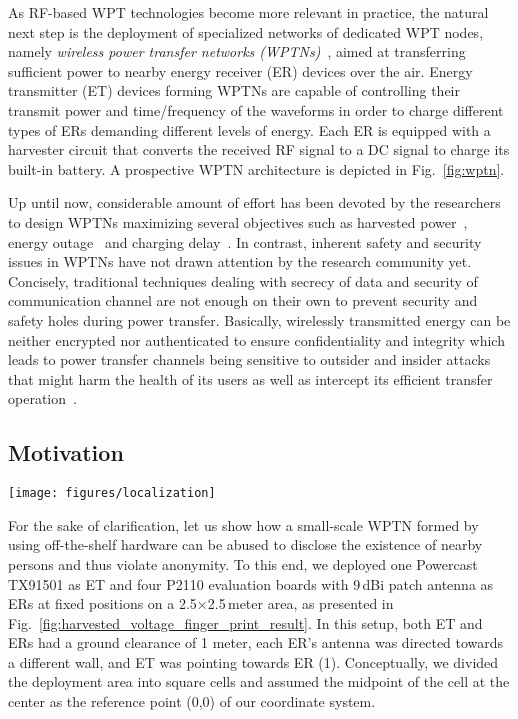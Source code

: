 \documentclass[journal,10pt,draftclsnofoot,onecolumn]{IEEEtran}
\begin{document}
As RF-based WPT technologies become more relevant in practice, the natural next step is the deployment of specialized networks of dedicated WPT nodes, namely \emph{wireless power transfer networks (WPTNs)}~\cite{liu15gwptn}, aimed at transferring sufficient power to nearby energy receiver (ER) devices over the air. Energy transmitter (ET) devices forming WPTNs are capable of controlling their transmit power and time/frequency of the waveforms in order to charge different types of ERs demanding different levels of energy. Each ER is equipped with a harvester circuit that converts the received RF signal to a DC signal to charge its built-in battery. A prospective WPTN architecture is depicted in Fig.~\ref{fig:wptn}.

Up until now, considerable amount of effort has been devoted by the researchers to design WPTNs maximizing several objectives such as harvested power~\cite{krikidis_tcom_2013}, energy outage~\cite{huang_arxiv_2012} and charging delay~\cite{fu_infocom_2013}. In contrast, inherent safety and security issues in WPTNs have not drawn attention by the research community yet. Concisely, traditional techniques dealing with secrecy of data and security of communication channel are not enough on their own to prevent security and safety holes during power transfer. Basically, wirelessly transmitted energy can be neither encrypted nor authenticated to ensure confidentiality and integrity which leads to power transfer channels being sensitive to outsider and insider attacks that might harm the health of its users as well as intercept its efficient transfer operation~\cite{secure_cooperative_kang_2015}. 

\subsection{Motivation}

\begin{figure*}
	\centering
	\texttt{[image: figures/localization]}
	\caption{The measured voltage level at the receiver (ER) when a person is present at different locations of an university office. Each square in each of four heatmaps represents a measured voltage by the harvester (located at the center of a room) with a person located at the marked position. Center square (marked by a black line) represents a measurement with no person present.}
	\label{fig:harvested_voltage_finger_print_result}
\end{figure*}

For the sake of clarification, let us show how a small-scale WPTN formed by using off-the-shelf hardware can be abused to disclose the existence of nearby persons and thus violate anonymity. To this end, we deployed one Powercast TX91501 as ET and four P2110 evaluation boards with 9\,dBi patch antenna as ERs at fixed positions on a 2.5$\times$2.5\,meter area, as presented in Fig.~\ref{fig:harvested_voltage_finger_print_result}. In this setup, both ET and ERs had a ground clearance of 1 meter, each ER's antenna was directed towards a different wall, and ET was pointing towards ER (1). Conceptually, we divided the deployment area into square cells and assumed the midpoint of the cell at the center as the reference point (0,0) of our coordinate system. 
\end{document}
